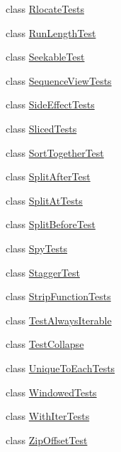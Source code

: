 \begin{DoxyCompactItemize}
\item 
class \hyperlink{classmore__itertools_1_1tests_1_1test__more_1_1_rlocate_tests}{Rlocate\+Tests}
\item 
class \hyperlink{classmore__itertools_1_1tests_1_1test__more_1_1_run_length_test}{Run\+Length\+Test}
\item 
class \hyperlink{classmore__itertools_1_1tests_1_1test__more_1_1_seekable_test}{Seekable\+Test}
\item 
class \hyperlink{classmore__itertools_1_1tests_1_1test__more_1_1_sequence_view_tests}{Sequence\+View\+Tests}
\item 
class \hyperlink{classmore__itertools_1_1tests_1_1test__more_1_1_side_effect_tests}{Side\+Effect\+Tests}
\item 
class \hyperlink{classmore__itertools_1_1tests_1_1test__more_1_1_sliced_tests}{Sliced\+Tests}
\item 
class \hyperlink{classmore__itertools_1_1tests_1_1test__more_1_1_sort_together_test}{Sort\+Together\+Test}
\item 
class \hyperlink{classmore__itertools_1_1tests_1_1test__more_1_1_split_after_test}{Split\+After\+Test}
\item 
class \hyperlink{classmore__itertools_1_1tests_1_1test__more_1_1_split_at_tests}{Split\+At\+Tests}
\item 
class \hyperlink{classmore__itertools_1_1tests_1_1test__more_1_1_split_before_test}{Split\+Before\+Test}
\item 
class \hyperlink{classmore__itertools_1_1tests_1_1test__more_1_1_spy_tests}{Spy\+Tests}
\item 
class \hyperlink{classmore__itertools_1_1tests_1_1test__more_1_1_stagger_test}{Stagger\+Test}
\item 
class \hyperlink{classmore__itertools_1_1tests_1_1test__more_1_1_strip_function_tests}{Strip\+Function\+Tests}
\item 
class \hyperlink{classmore__itertools_1_1tests_1_1test__more_1_1_test_always_iterable}{Test\+Always\+Iterable}
\item 
class \hyperlink{classmore__itertools_1_1tests_1_1test__more_1_1_test_collapse}{Test\+Collapse}
\item 
class \hyperlink{classmore__itertools_1_1tests_1_1test__more_1_1_unique_to_each_tests}{Unique\+To\+Each\+Tests}
\item 
class \hyperlink{classmore__itertools_1_1tests_1_1test__more_1_1_windowed_tests}{Windowed\+Tests}
\item 
class \hyperlink{classmore__itertools_1_1tests_1_1test__more_1_1_with_iter_tests}{With\+Iter\+Tests}
\item 
class \hyperlink{classmore__itertools_1_1tests_1_1test__more_1_1_zip_offset_test}{Zip\+Offset\+Test}
\end{DoxyCompactItemize}
